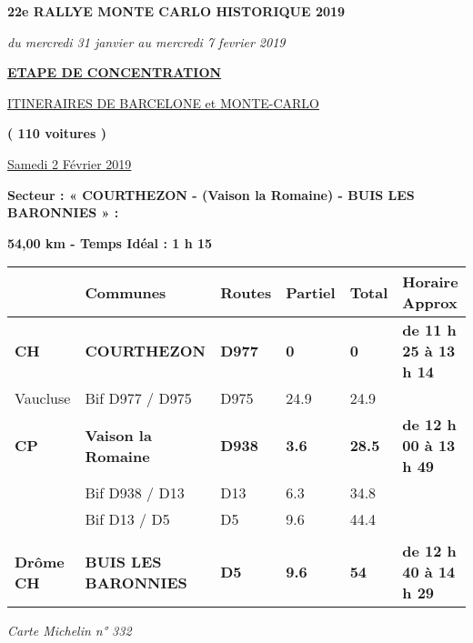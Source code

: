 \documentclass{article}%
\begin{document}
%
\normalsize%
\begin{center} \textbf{\LARGE{22e RALLYE MONTE CARLO HISTORIQUE 2019}} \end{center}%
\begin{center} \textit{du mercredi 31 janvier au mercredi 7 fevrier 2019} \end{center}%
\begin{center} \textbf{\underline{ETAPE DE CONCENTRATION}} \end{center}%
\begin{center} \underline{ITINERAIRES DE BARCELONE et MONTE-CARLO} \end{center}%
\begin{center} \textbf{( 110 voitures )} \end{center}%
\begin{flushright} \underline{ Samedi 2 Février 2019} \end{flushright}%
\begin{flushleft} \textbf{Secteur : « COURTHEZON - (Vaison la Romaine) -  BUIS LES BARONNIES » :
} \end{flushleft}%
\begin{flushright} \textbf{54,00 km - Temps Idéal : 1 h 15
} \end{flushright}%
\begin{longtable}{p{2.25cm}|p{7.0cm}|p{1.5cm}|p{1.5cm}|p{1.5cm}|p{3.5cm}}%
\hline%
&Communes&Routes&Partiel&Total&Horaire Approx\\%
\hline%
\endhead%
\endfoot%
\endlastfoot%
\textbf{﻿CH }&\textbf{COURTHEZON}&\textbf{D977}&\textbf{0}&\textbf{0}&\textbf{de 11 h 25 à 13 h 14
}\\%
Vaucluse&Bif D977 / D975&D975&24.9&24.9& \\%
\textbf{CP}&\textbf{Vaison la Romaine}&\textbf{D938}&\textbf{3.6}&\textbf{28.5}&\textbf{de 12 h 00 à 13 h 49
}\\%
 &Bif D938 / D13&D13 &6.3&34.8& \\%
 &Bif D13 / D5&D5&9.6&44.4& \\%
\hline& & & & & \\%
\textbf{ Drôme     CH}&\textbf{BUIS LES BARONNIES}&\textbf{D5}&\textbf{9.6}&\textbf{54}&\textbf{de 12 h 40 à 14 h 29
}\\%
\hline%
\end{longtable}%
\begin{flushleft} \textit{Carte Michelin n° 332
} \end{flushleft}%
\end{document}
